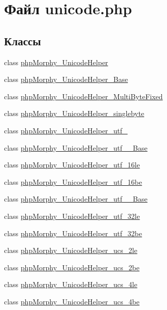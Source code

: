 \hypertarget{unicode_8php}{
\section{Файл unicode.php}
\label{unicode_8php}
}
\subsection*{Классы}
\begin{DoxyCompactItemize}
\item 
class \hyperlink{classphpMorphy__UnicodeHelper}{phpMorphy\_\-UnicodeHelper}
\item 
class \hyperlink{classphpMorphy__UnicodeHelper__Base}{phpMorphy\_\-UnicodeHelper\_\-Base}
\item 
class \hyperlink{classphpMorphy__UnicodeHelper__MultiByteFixed}{phpMorphy\_\-UnicodeHelper\_\-MultiByteFixed}
\item 
class \hyperlink{classphpMorphy__UnicodeHelper__singlebyte}{phpMorphy\_\-UnicodeHelper\_\-singlebyte}
\item 
class \hyperlink{classphpMorphy__UnicodeHelper__utf__8}{phpMorphy\_\-UnicodeHelper\_\-utf\_}
\item 
class \hyperlink{classphpMorphy__UnicodeHelper__utf__16__Base}{phpMorphy\_\-UnicodeHelper\_\-utf\_\_\-Base}
\item 
class \hyperlink{classphpMorphy__UnicodeHelper__utf__16le}{phpMorphy\_\-UnicodeHelper\_\-utf\_\-16le}
\item 
class \hyperlink{classphpMorphy__UnicodeHelper__utf__16be}{phpMorphy\_\-UnicodeHelper\_\-utf\_\-16be}
\item 
class \hyperlink{classphpMorphy__UnicodeHelper__utf__32__Base}{phpMorphy\_\-UnicodeHelper\_\-utf\_\_\-Base}
\item 
class \hyperlink{classphpMorphy__UnicodeHelper__utf__32le}{phpMorphy\_\-UnicodeHelper\_\-utf\_\-32le}
\item 
class \hyperlink{classphpMorphy__UnicodeHelper__utf__32be}{phpMorphy\_\-UnicodeHelper\_\-utf\_\-32be}
\item 
class \hyperlink{classphpMorphy__UnicodeHelper__ucs__2le}{phpMorphy\_\-UnicodeHelper\_\-ucs\_\-2le}
\item 
class \hyperlink{classphpMorphy__UnicodeHelper__ucs__2be}{phpMorphy\_\-UnicodeHelper\_\-ucs\_\-2be}
\item 
class \hyperlink{classphpMorphy__UnicodeHelper__ucs__4le}{phpMorphy\_\-UnicodeHelper\_\-ucs\_\-4le}
\item 
class \hyperlink{classphpMorphy__UnicodeHelper__ucs__4be}{phpMorphy\_\-UnicodeHelper\_\-ucs\_\-4be}
\end{DoxyCompactItemize}
